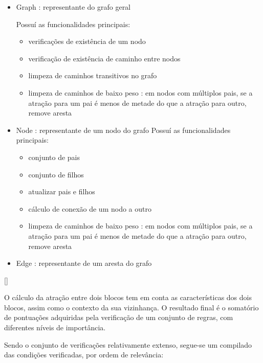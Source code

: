 \begin{itemize}\setlength\itemsep{-0.3em}
	\item Graph : representante do grafo geral
	
		Possuí as funcionalidades principais:
		\begin{itemize}\setlength\itemsep{-0.3em}
			\item verificações de existência de um nodo
			\item verificação de existência de caminho entre nodos
			\item limpeza de caminhos transitivos no grafo
			\item limpeza de caminhos de baixo peso : em nodos com múltiplos pais, se a atração para um pai é menos de metade do que a atração para outro, remove aresta
		\end{itemize}
	\item Node : representante de um nodo do grafo
		Possuí as funcionalidades principais:
		\begin{itemize}\setlength\itemsep{-0.3em}
			\item conjunto de pais
			\item conjunto de filhos
			\item atualizar pais e filhos
			\item cálculo de conexão de um nodo a outro
			\item limpeza de caminhos de baixo peso : em nodos com múltiplos pais, se a atração para um pai é menos de metade do que a atração para outro, remove aresta
		\end{itemize}
	\item Edge : representante de um aresta do grafo
\end{itemize}


[\normalsize]

O cálculo da atração entre dois blocos tem em conta as características dos dois blocos, assim como o contexto da sua vizinhança. O resultado final é o somatório de pontuações adquiridas pela verificação de um conjunto de regras, com diferentes níveis de importância. 

Sendo o conjunto de verificações relativamente extenso, segue-se um compilado das condições verificadas, por ordem de relevância:

